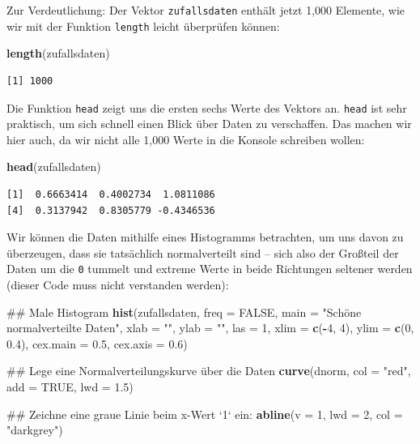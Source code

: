 \documentclass[12pt,]{tufte-book}
\newenvironment{Shaded}{\begin{snugshade}}{\end{snugshade}}
\newcommand{\KeywordTok}[1]{\textcolor[rgb]{0.13,0.29,0.53}{\textbf{#1}}}
\newcommand{\DataTypeTok}[1]{\textcolor[rgb]{0.13,0.29,0.53}{#1}}
\newcommand{\DecValTok}[1]{\textcolor[rgb]{0.00,0.00,0.81}{#1}}
\newcommand{\FloatTok}[1]{\textcolor[rgb]{0.00,0.00,0.81}{#1}}
\newcommand{\StringTok}[1]{\textcolor[rgb]{0.31,0.60,0.02}{#1}}
\newcommand{\OtherTok}[1]{\textcolor[rgb]{0.56,0.35,0.01}{#1}}
\newcommand{\OperatorTok}[1]{\textcolor[rgb]{0.81,0.36,0.00}{\textbf{#1}}}
\newcommand{\NormalTok}[1]{#1}
\theoremstyle{definition}
\theoremstyle{definition}
\theoremstyle{definition}
\theoremstyle{remark}
\begin{document}
Zur Verdeutlichung: Der Vektor \texttt{zufallsdaten} enthält jetzt 1,000
Elemente, wie wir mit der Funktion \texttt{length} leicht überprüfen
können:

\begin{Shaded}
\begin{Highlighting}[]
\KeywordTok{length}\NormalTok{(zufallsdaten)}
\end{Highlighting}
\end{Shaded}

\begin{verbatim}
[1] 1000
\end{verbatim}

Die Funktion \texttt{head} zeigt uns die ersten sechs Werte des Vektors
an. \texttt{head} ist sehr praktisch, um sich schnell einen Blick über
Daten zu verschaffen. Das machen wir hier auch, da wir nicht alle 1,000
Werte in die Konsole schreiben wollen:

\begin{Shaded}
\begin{Highlighting}[]
\KeywordTok{head}\NormalTok{(zufallsdaten)}
\end{Highlighting}
\end{Shaded}

\begin{verbatim}
[1]  0.6663414  0.4002734  1.0811086
[4]  0.3137942  0.8305779 -0.4346536
\end{verbatim}

Wir können die Daten mithilfe eines Histogramms betrachten, um uns davon
zu überzeugen, dass sie tatsächlich normalverteilt sind -- sich also der
Großteil der Daten um die \texttt{0} tummelt und extreme Werte in beide
Richtungen seltener werden (dieser Code muss nicht verstanden werden):

\begin{Shaded}
\begin{Highlighting}[]
\NormalTok{## Male Histogram}
\KeywordTok{hist}\NormalTok{(zufallsdaten, }\DataTypeTok{freq =} \OtherTok{FALSE}\NormalTok{,}
     \DataTypeTok{main =} \StringTok{"Schöne normalverteilte Daten"}\NormalTok{,}
     \DataTypeTok{xlab =} \StringTok{""}\NormalTok{, }\DataTypeTok{ylab =} \StringTok{""}\NormalTok{, }\DataTypeTok{las =} \DecValTok{1}\NormalTok{,}
     \DataTypeTok{xlim =} \KeywordTok{c}\NormalTok{(}\OperatorTok{-}\DecValTok{4}\NormalTok{, }\DecValTok{4}\NormalTok{), }\DataTypeTok{ylim =} \KeywordTok{c}\NormalTok{(}\DecValTok{0}\NormalTok{, }\FloatTok{0.4}\NormalTok{),}
     \DataTypeTok{cex.main =} \FloatTok{0.5}\NormalTok{, }\DataTypeTok{cex.axis =} \FloatTok{0.6}\NormalTok{)}

\NormalTok{## Lege eine Normalverteilungskurve über die Daten}
\KeywordTok{curve}\NormalTok{(dnorm, }\DataTypeTok{col =} \StringTok{"red"}\NormalTok{, }\DataTypeTok{add =} \OtherTok{TRUE}\NormalTok{, }\DataTypeTok{lwd =} \FloatTok{1.5}\NormalTok{)}

\NormalTok{## Zeichne eine graue Linie beim x-Wert `1` ein:}
\KeywordTok{abline}\NormalTok{(}\DataTypeTok{v =} \DecValTok{1}\NormalTok{, }\DataTypeTok{lwd =} \DecValTok{2}\NormalTok{, }\DataTypeTok{col =} \StringTok{"darkgrey"}\NormalTok{)}
\end{Highlighting}
\end{Shaded}
\end{document}
